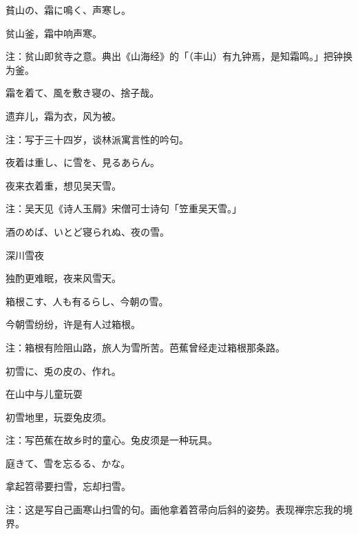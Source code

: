 \begin{haiku}
    {\FH 貧山の、霜に鳴く、声寒し。}

    {\FK 贫山釜，霜中响声寒。}

    {\FT 注：贫山即贫寺之意。典出《山海经》的「（丰山）有九钟焉，是知霜鸣。」把钟换为釜。}
\end{haiku}

\begin{haiku}
    {\FH 霜を着て、風を敷き寝の、捨子哉。}

    {\FK 遗弃儿，霜为衣，风为被。}

    {\FT 注：写于三十四岁，谈林派寓言性的吟句。}
\end{haiku}

\begin{haiku}
    {\FH 夜着は重し、に雪を、見るあらん。}

    {\FK 夜来衣着重，想见吴天雪。}

    {\FT 注：吴天见《诗人玉屑》宋僧可士诗句「笠重吴天雪。」}
\end{haiku}

\begin{haiku}
    {\FH 酒のめば、いとど寝られぬ、夜の雪。}

    {\FK 深川雪夜}

    {\FK 独酌更难眠，夜来风雪天。}
\end{haiku}

\begin{haiku}
    {\FH 箱根こす、人も有るらし、今朝の雪。}

    {\FK 今朝雪纷纷，许是有人过箱根。}

    {\FT 注：箱根有险阻山路，旅人为雪所苦。芭蕉曾经走过箱根那条路。}
\end{haiku}

\begin{haiku}
    {\FH 初雪に、兎の皮の、作れ。}

    {\FK 在山中与儿童玩耍}

    {\FK 初雪地里，玩耍兔皮须。}

    {\FT 注：写芭蕉在故乡时的童心。兔皮须是一种玩具。}
\end{haiku}

\begin{haiku}
    {\FH 庭きて、雪を忘るる、かな。}

    {\FK 拿起笤帚要扫雪，忘却扫雪。}

    {\FT 注：这是写自己画寒山扫雪的句。画他拿着笤帚向后斜的姿势。表现禅宗忘我的境界。}
\end{haiku}

